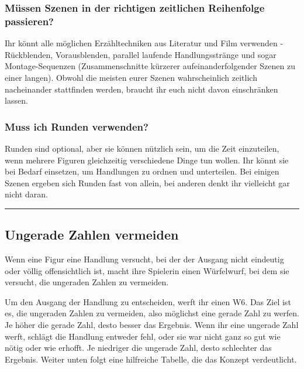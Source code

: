 \documentclass[]{article}
\begin{document}
\subsubsection{Müssen Szenen in der richtigen zeitlichen Reihenfolge
passieren?}\label{muxfcssen-szenen-in-der-richtigen-zeitlichen-reihenfolge-passieren}

Ihr könnt alle möglichen Erzähltechniken aus Literatur und Film
verwenden - Rückblenden, Vorausblenden, parallel laufende
Handlungsstränge und sogar Montage-Sequenzen (Zusammenschnitte kürzerer
aufeinanderfolgender Szenen zu einer langen). Obwohl die meisten eurer
Szenen wahrscheinlich zeitlich nacheinander stattfinden werden, braucht
ihr euch nicht davon einschränken lassen.

\subsubsection{Muss ich Runden
verwenden?}\label{muss-ich-runden-verwenden}

Runden sind optional, aber sie können nützlich sein, um die Zeit
einzuteilen, wenn mehrere Figuren gleichzeitig verschiedene Dinge tun
wollen. Ihr könnt sie bei Bedarf einsetzen, um Handlungen zu ordnen und
unterteilen. Bei einigen Szenen ergeben sich Runden fast von allein, bei
anderen denkt ihr vielleicht gar nicht daran.

\columnsend

\begin{center}\rule{0.5\linewidth}{\linethickness}\end{center}

\subsection{Ungerade Zahlen vermeiden}\label{ungerade-zahlen-vermeiden}

Wenn eine Figur eine Handlung versucht, bei der der Ausgang nicht
eindeutig oder völlig offensichtlich ist, macht ihre Spielerin einen
Würfelwurf, bei dem sie versucht, die ungeraden Zahlen zu vermeiden.

Um den Ausgang der Handlung zu entscheiden, werft ihr einen W6. Das Ziel
ist es, die ungeraden Zahlen zu vermeiden, also möglichst eine gerade
Zahl zu werfen. Je höher die gerade Zahl, desto besser das Ergebnis.
Wenn ihr eine ungerade Zahl werft, schlägt die Handlung entweder fehl,
oder sie war nicht ganz so gut wie nötig oder wie erhofft. Je niedriger
die ungerade Zahl, desto schlechter das Ergebnis. Weiter unten folgt
eine hilfreiche Tabelle, die das Konzept verdeutlicht.
\end{document}
